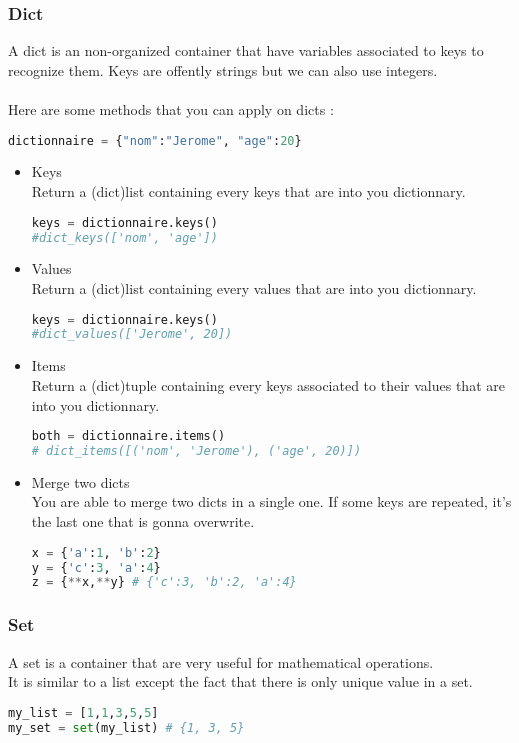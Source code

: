 \documentclass[a4paper, 12pt, titlepage]{scrartcl} %
\begin{document}
\subsubsection{Dict}
A dict is an non-organized container that have variables associated to keys to recognize them. Keys are offently strings but we can also use integers.\\ \\
Here are some methods that you can apply on dicts : 
\begin{lstlisting}[language=Python]
dictionnaire = {"nom":"Jerome", "age":20}
\end{lstlisting}

\begin{itemize}
\item Keys \\
Return a (dict)list containing every keys that are into you dictionnary.
\begin{lstlisting}[language=Python]
keys = dictionnaire.keys()
#dict_keys(['nom', 'age'])
\end{lstlisting}

\item Values \\
Return a (dict)list containing every values that are into you dictionnary.
\begin{lstlisting}[language=Python]
keys = dictionnaire.keys()
#dict_values(['Jerome', 20])
\end{lstlisting}

\item Items \\
Return a (dict)tuple containing every keys associated to their values that are into you dictionnary.
\begin{lstlisting}[language=Python]
both = dictionnaire.items()
# dict_items([('nom', 'Jerome'), ('age', 20)])
\end{lstlisting}
\item Merge two dicts \\
You are able to merge two dicts in a single one. If some keys are repeated, it's the last one that is gonna overwrite.
\begin{lstlisting}[language=Python]
x = {'a':1, 'b':2}
y = {'c':3, 'a':4}
z = {**x,**y} # {'c':3, 'b':2, 'a':4}
\end{lstlisting}
\end{itemize}


\subsubsection{Set}
A set is a container that are very useful for mathematical operations.\\
It is similar to a list except the fact that there is only unique value in a set.
\begin{lstlisting}[language=Python]
my_list = [1,1,3,5,5]
my_set = set(my_list) # {1, 3, 5}
\end{lstlisting}
\end{document}
